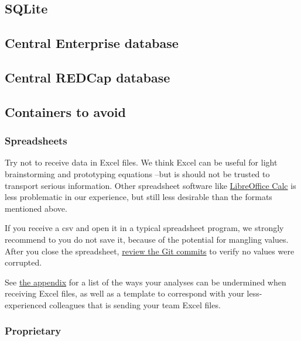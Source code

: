 \documentclass[
]{book}
\begin{document}
\hypertarget{data-containers-sqlite}{%
\subsection{SQLite}\label{data-containers-sqlite}}

\hypertarget{data-containers-database}{%
\subsection{Central Enterprise database}\label{data-containers-database}}

\hypertarget{data-containers-redcap}{%
\subsection{Central REDCap database}\label{data-containers-redcap}}

\hypertarget{data-containers-avoid}{%
\subsection{Containers to avoid}\label{data-containers-avoid}}

\hypertarget{data-containers-avoid-spreadsheets}{%
\subsubsection{Spreadsheets}\label{data-containers-avoid-spreadsheets}}

Try not to receive data in Excel files. We think Excel can be useful for light brainstorming and prototyping equations --but is should not be trusted to transport serious information. Other spreadsheet software like \href{https://en.wikipedia.org/wiki/LibreOffice_Calc}{LibreOffice Calc} is less problematic in our experience, but still less desirable than the formats mentioned above.

If you receive a csv and open it in a typical spreadsheet program, we strongly recommend to you do not save it, because of the potential for mangling values. After you close the spreadsheet, \protect\hyperlink{git-stability}{review the Git commits} to verify no values were corrupted.

See \protect\hyperlink{snippets-correspondence-excel}{the appendix} for a list of the ways your analyses can be undermined when receiving Excel files, as well as a template to correspond with your less-experienced colleagues that is sending your team Excel files.

\hypertarget{data-containers-avoid-proprietary}{%
\subsubsection{Proprietary}\label{data-containers-avoid-proprietary}}
\end{document}
